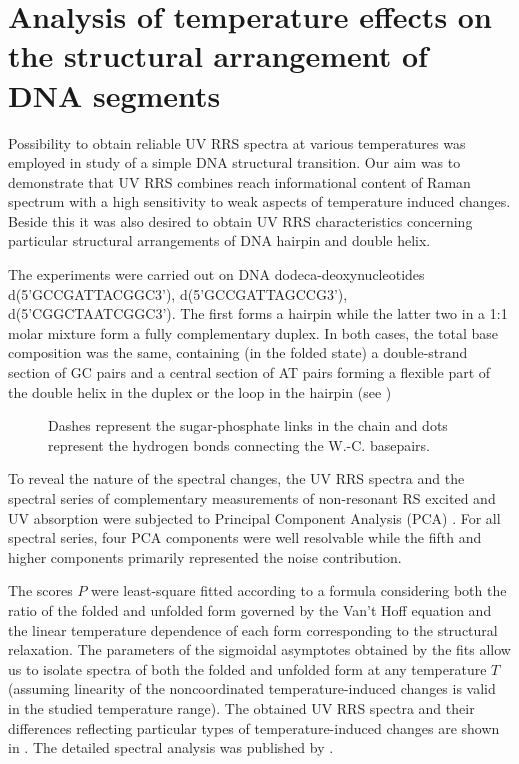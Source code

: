 \section{%
	Analysis of temperature effects on the structural arrangement of DNA segments
}

Possibility to obtain reliable UV RRS spectra at various temperatures was
employed in study of a simple DNA structural transition.
Our aim was to demonstrate that UV RRS combines reach informational content of
Raman spectrum with a high sensitivity to weak aspects of temperature induced
changes.
Beside this it was also desired to obtain UV RRS characteristics concerning
particular structural arrangements of DNA hairpin and double helix.

The experiments were carried out on DNA dodeca-deoxynucleotides
d(5'GCCG\allowbreak{}ATTACGGC3'), d(5'GCCGATTAGCCG3'), d(5'CGGCTAATCGGC3').
The first forms a hairpin while the latter two in a 1:1 molar mixture form a
fully complementary duplex.
In both cases, the total base composition was the same, containing (in the
folded state) a double-strand section of GC pairs and a central section of AT
pairs forming a flexible part of the double helix in the duplex or the loop in
the hairpin
(see )

\begin{figure}[t]
	\centering
	\caption[%
		Scheme of an arrangement of the studied dodecadeoxynucleotides in the
		folded state.
	]{%
		Dashes represent the sugar-phosphate links in the chain and dots represent
		the hydrogen bonds connecting the W.-C. basepairs.
	}
	\label{\figlabel{dna_hairpins:structure}}
\end{figure}

To reveal the nature of the spectral changes, the UV RRS spectra and the
spectral series of complementary measurements of non-resonant RS excited and UV
absorption were subjected to Principal Component Analysis (PCA)
\parencite{Malinowski2002}.
For all spectral series, four PCA components were well resolvable while the
fifth and higher components primarily represented the noise contribution.

The scores $P$ were least-square fitted according to a formula considering both
the ratio of the folded and unfolded form governed by the Van’t Hoff equation
and the linear temperature dependence of each form corresponding to the
structural relaxation.
The parameters of the sigmoidal asymptotes obtained by the fits allow us to
isolate spectra of both the folded and unfolded form at any temperature $T$
(assuming linearity of the noncoordinated temperature-induced changes is valid
in the studied temperature range).
The obtained UV RRS spectra and their differences reflecting particular types
of temperature-induced changes are shown in
.
The detailed spectral analysis was published by
\textcite{Klener2021}.

